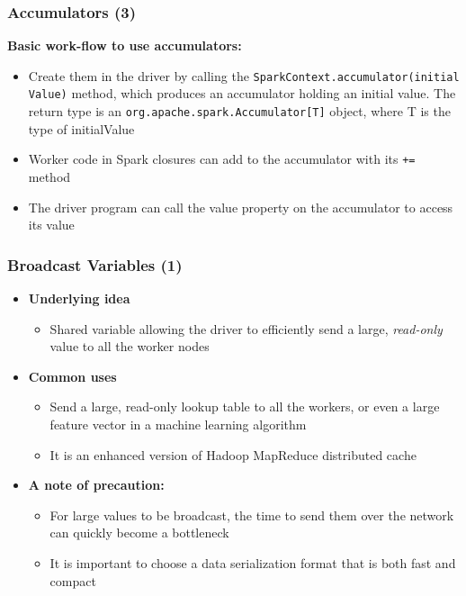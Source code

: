 \begin{frame}\frametitle{Accumulators (3)}
{\bf Basic work-flow to use accumulators:}

\vspace{20pt}

\begin{itemize}
	\item Create them in the driver by calling the \texttt{SparkContext.accumulator(initial Value)} method, which produces an accumulator holding an initial value. The return type is an \texttt{org.apache.spark.Accumulator[T]} object, where T is the type of initialValue
	\item Worker code in Spark closures can add to the accumulator with its \texttt{+=} method
	\item The driver program can call the value property on the accumulator to access its value
\end{itemize}
\end{frame}

\begin{frame}\frametitle{Broadcast Variables (1)}
\begin{itemize}
	\item {\bf Underlying idea}
	\begin{itemize}
		\item Shared variable allowing the driver to efficiently send a large, \emph{read-only} value to all the worker nodes
	\end{itemize}
	\item {\bf Common uses}
	\begin{itemize}
		\item Send a large, read-only lookup table to all the workers, or even a large feature vector in a machine learning algorithm
		\item It is an enhanced version of Hadoop MapReduce distributed cache
	\end{itemize}
	\item {\bf A note of precaution:}
	\begin{itemize}
		\item For large values to be broadcast, the time to send them over the network can quickly become a bottleneck
		\item It is important to choose a data serialization format that is both fast and compact
	\end{itemize}
\end{itemize}
\end{frame}

